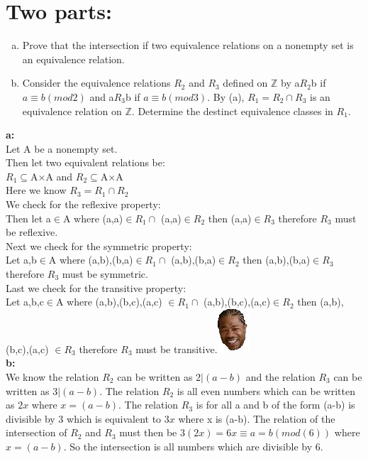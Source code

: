 \section{Two parts:}
\begin{enumerate}[a.]
\item Prove that the intersection if two equivalence relations on a nonempty set is an equivalence relation.
\item Consider the equivalence relations $R_2$ and $R_3$ defined on $\mathbb{Z}$ by a$R_2$b if $a\equiv b(mod 2)$ and a$R_3$b if $a\equiv b(mod 3)$. By (a), $R_1=R_2\cap R_3$ is an equivalence relation on $\mathbb{Z}$. Determine the destinct equivalence classes in $R_1$.
\end{enumerate}
\textbf{a:}\\
Let A be a nonempty set.\\
Then let two equivalent relations be:\\
$R_1\subseteq $A$\times$A and $R_2\subseteq $A$\times$A\\
Here we know $R_3=R_1 \cap R_2$\\
We check for the reflexive property:\\
Then let a$\in$A where (a,a)$\in R_1 \cap$ (a,a)$\in R_2$ then (a,a)$\in R_3$ therefore $R_3$ must be reflexive.\\
Next we check for the symmetric property:\\
Let a,b$\in$A where (a,b),(b,a)$\in R_1 \cap$ (a,b),(b,a)$\in R_2$ then (a,b),(b,a)$\in R_3$ therefore $R_3$ must be symmetric.\\
Last we check for the transitive property:\\
Let a,b,c$\in$A where (a,b),(b,c),(a,c) $\in R_1 \cap$ (a,b),(b,c),(a,c)$\in R_2$ then (a,b),(b,c),(a,c) $\in R_3$ therefore $R_3$ must be transitive.\includegraphics[scale=0.70]{billeder/xzibit}\\
\textbf{b:}\\
We know the relation $R_2$ can be written as $2|(a-b)$ and the relation $R_3$ can be written as $3|(a-b)$. The relation $R_2$ is all even numbers which can be written as $2x$ where $x=(a-b)$. The relation $R_3$ is for all a and b of the form (a-b) is divisible by 3 which is equivalent to $3x$ where x is (a-b). The relation of the intersection of $R_2$ and $R_3$ must then be $3(2x)=6x\equiv a=b(mod(6))$ where $x=(a-b)$. So the intersection is all numbers which are divisible by 6.
